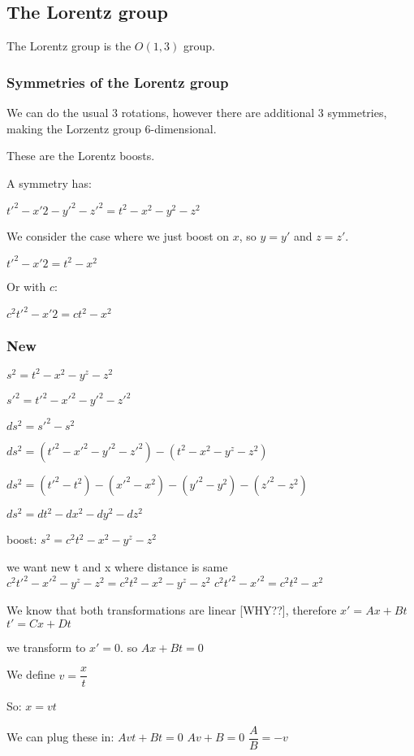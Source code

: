 
\subsection{The Lorentz group}

The Lorentz group is the \(O(1,3)\) group.
\subsubsection{Symmetries of the Lorentz group}

We can do the usual \(3\) rotations, however there are additional \(3\) symmetries, making the Lorzentz group \(6\)-dimensional.

These are the Lorentz boosts.

A symmetry has:

\(t'^2 - x'2 - y'^2 - z'^2 = t^2 - x^2 - y^2 - z^2\)

We consider the case where we just boost on \(x\), so \(y = y'\) and \(z = z'\).

\(t'^2 - x'2 = t^2 - x^2\)

Or with \(c\):

\(c^2t'^2 - x'2 = ct^2 - x^2\)


\subsubsection{New}
\(s^2 = t^2 - x^2 - y^z - z^2\)

\(s'^2 = t'^2 - x'^2 - y'^2 - z'^2\)

\(ds^2 = s'^2 - s^2\)

\(ds^2 = (t'^2 - x'^2 - y'^2 - z'^2) - (t^2 - x^2 - y^z - z^2)\)

\(ds^2 = (t'^2 - t^2) - (x'^2 - x^2) - (y'^2 - y^2) - (z'^2 - z^2)\)

\(ds^2 = dt^2 - dx^2 - dy^2 - dz^2\)


boost:
\(s^2 = c^2t^2 - x^2 - y^z - z^2\)

we want new t and x where distance is same
\(c^2t'^2 - x'^2 - y^z - z^2 = c^2t^2 - x^2 - y^z -z^2\)
\(c^2t'^2 - x'^2 = c^2t^2 - x^2\)

We know that both transformations are linear [WHY??], therefore
\(x' = Ax + Bt\)
\(t' = Cx+Dt\)

we transform to \(x' = 0\). so
\(Ax + Bt = 0\)

We define
\(v = \dfrac{x}{t}\)

So:
\(x = vt\)

We can plug these in:
\(Avt + Bt = 0\)
\(Av + B = 0\)
\(\dfrac{A}{B} = -v\)

